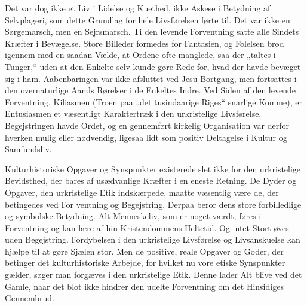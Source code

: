\documentclass[12pt,a4paper,openany]{book}
\newcommand{\opage}[1]{\marginnote{\footnotesize\textit{[#1]}}}
\begin{document}
Det var dog ikke et Liv i Lidelse og Kuethed, ikke Askese i Betydning af
Selvplageri, som dette Grundlag for hele Livsførelsen førte til. Det var
ikke en Sørgemarsch, men en Sejrsmarsch. Ti den levende Forventning
satte alle Sindets Kræfter i Bevægelse. Store Billeder formedes for
Fantasien, og Følelsen brød igennem med en saadan Vælde, at Ordene ofte
manglede, saa der „taltes i Tunger,“ uden at den Enkelte selv kunde gøre
Rede for, hvad der havde bevæget sig i ham. Aabenbaringen var ikke
afsluttet ved Jesu Bortgang, men fortsattes i den overnaturlige Aands
Rørelser i de Enkeltes Indre. Ved Siden af den levende Forventning,
Kiliasmen (Troen paa „det tusindaarige Riges“ snarlige Komme), er
Entusiasmen et væsentligt Karaktertræk i den urkristelige Livsførelse.
Begejstringen havde Ordet, og en gennemført kirkelig Organisation var
derfor hverken mulig eller nødvendig, ligesaa lidt som positiv
Deltagelse i Kultur og Samfundsliv.

Kulturhistoriske Opgaver og Synspunkter existerede slet ikke for den
urkristelige Bevidsthed, der bares af usædvanlige Kræfter i en eneste
Retning. De Dyder og Opgaver, den urkristelige Etik indskærpede, maatte
væsentlig være de, der betingedes ved For%
\opage{231}ventning og Begejstring. Derpaa beror dens store
forbilledlige og symbolske Betydning. Alt Menneskeliv, som er noget
værdt, føres i Forventning og kan lære af hin Kristendommens Heltetid.
Og intet Stort øves uden Begejstring. Fordybelsen i den urkristelige
Livsførelse og Livsanskuelse kan hjælpe til at gøre Sjælen stor. Men de
positive, reale Opgaver og Goder, der betinger det kulturhistoriske
Arbejde, for hvilket nu vore etiske Synspunkter gælder, søger man
forgæves i den urkristelige Etik. Denne lader Alt blive ved det Gamle,
naar det blot ikke hindrer den udelte Forventning om det Hinsidiges
Gennembrud.
\end{document}

